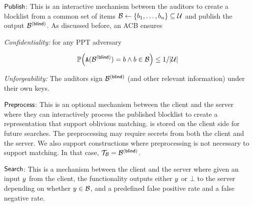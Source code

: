 
\itemListStart
\item $\mathsf{Publish}$: This is an interactive mechanism between the auditors to create a blocklist from a common set of items $\blocklist \assign \{\genericBlocklistElmt_1, \dots, \genericBlocklistElmt_\blocklistSize \} \subseteq \universe$ and publish the output $\blindedBlocklist$. As discussed before, an ACB ensures 

\itemListStart

\item \emph{Confidentiality:} for any PPT adversary \adversary 


\[
\prob{\adversary(\blindedBlocklist) = \genericBlocklistElmt \land \genericBlocklistElmt \in \blocklist} \le 1/|\universe|
\]

\item \emph{Unforgeability:} The auditors sign $\blindedBlocklist$ (and other relevant information) under their own keys.  

\itemListEnd
  
\item $ \mathsf{Preprocess}$: This is an optional mechanism between the client and the server where they can interactively process the published blocklist to create a representation \blklistToken that support oblivious matching. 
\blklistToken is stored on the client side for future searches. The preprocessing may require secrets from both the client and the server. We also support constructions where preprocessing is not necessary to support matching. In that case, $\blklistToken = \blindedBlocklist$. 


\item $\mathsf{Search}$: This is a mechanism between the client and the server where given an input $\genericCInputElmt$ from the client, the functionality outputs either $\genericCInputElmt$ or $\bot$ to the server depending on whether $\genericCInputElmt \in \blocklist$, and a predefined false positive rate and a false negative rate. 

